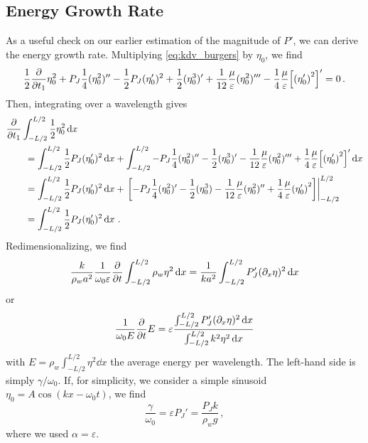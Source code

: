 \documentclass{jfm}
\let\Oldsubsection\subsection
\renewcommand{\subsection}{\FloatBarrier\Oldsubsection}
\renewcommand*{\epsilon}{\varepsilon}
\begin{document}
\subsection{Energy Growth Rate \label{sec:energy_growth_rate}}
As a useful check on our earlier estimation of the magnitude of $P'$, we
can derive the energy growth rate.
Multiplying \cref{eq:kdv_burgers} by $\eta_0$, we find
\begin{equation}
  \frac{1}{2} \pdv{t_1} \eta_0^2 + P_J
  \frac{1}{4} (\eta_0^2)'' - \frac{1}{2} P_J
  (\eta_0')^2 + \frac{1}{2} (\eta_0^3)' + \frac{1}{12}
  \frac{\mu}{\epsilon} (\eta_0^2)''' - \frac{1}{4} \frac{\mu}{\epsilon}
  \bqty{\pqty{\eta_0'}^2}' = 0 \,.
\end{equation}
Then, integrating over a wavelength gives
\begin{equation}
  \begin{split}
  &\pdv{t_1} \int_{-L/2}^{L/2} \frac{1}{2} \eta_0^2 \dd{x} \\
  &\qquad= \int_{-L/2}^{L/2} \frac{1}{2} P_J
    (\eta_0')^2 \dd{x} + \int_{-L/2}^{L/2} -P_J
    \frac{1}{4} (\eta_0^2)'' - \frac{1}{2}
    (\eta_0^3)' - \frac{1}{12} \frac{\mu}{\epsilon} (\eta_0^2)''' +
    \frac{1}{4} \frac{\mu}{\epsilon} \bqty{\pqty{\eta_0'}^2}' \dd{x}
  \\
  &\qquad=
  \int_{-L/2}^{L/2} \frac{1}{2} P_J
  (\eta_0')^2 \dd{x} + \eval{\bqty{-P_J
      \frac{1}{4} (\eta_0^2)' - \frac{1}{2} (\eta_0^3) - \frac{1}{12}
      \frac{\mu}{\epsilon} (\eta_0^2)'' + \frac{1}{4}
      \frac{\mu}{\epsilon} \pqty{\eta_0'}^2}}_{-L/2}^{L/2}
  \\
  &\qquad=
  \int_{-L/2}^{L/2} \frac{1}{2} P_J
  (\eta_0')^2 \dd{x} \,.
  \end{split}
\end{equation}
Redimensionalizing, we find
\begin{equation}
  \frac{k}{\rho_w a^2} \frac{1}{\omega_0 \epsilon} \pdv{t} \int_{-L/2}^{L/2}
  \rho_w \eta^2 \dd{x} = \frac{1}{k a^2} \int_{-L/2}^{L/2} P_J'
  (\partial_x \eta)^2 \dd{x}
\end{equation}
or
\begin{equation}
  \frac{1}{\omega_0 E} \pdv{t} E =
  \epsilon
  \frac{
    \int_{-L/2}^{L/2} P_J' (\partial_x \eta)^2 \dd{x}
  }
  {
    \int_{-L/2}^{L/2} k^2 \eta^2 \dd{x}
  }
\end{equation}
with $E = \rho_w \int_{-L/2}^{L/2} \eta^2 \dd{x}$ the average
energy per wavelength.
The left-hand side is simply $\gamma/\omega_0$.
If, for simplicity, we consider a simple sinusoid $\eta_0 = A \cos(k x -
\omega_0 t)$, we find
\begin{equation}
  \frac{\gamma}{\omega_0} = \epsilon P_J' = \frac{P_J k}{\rho_w g} \,,
\end{equation}
where we used $\alpha = \epsilon$.
\end{document}
